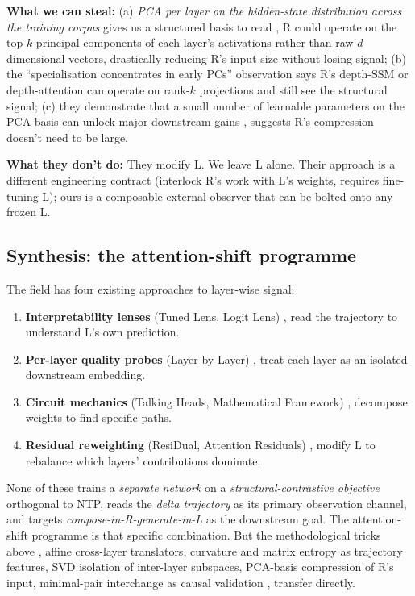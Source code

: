 \documentclass[10pt, twocolumn, a4paper]{article}
\begin{document}
\textbf{What we can steal:} (a) \emph{PCA per layer on the hidden-state distribution across the training corpus} gives us a structured basis to read ,  R could operate on the top-$k$ principal components of each layer's activations rather than raw $d$-dimensional vectors, drastically reducing R's input size without losing signal; (b) the ``specialisation concentrates in early PCs'' observation says R's depth-SSM or depth-attention can operate on rank-$k$ projections and still see the structural signal; (c) they demonstrate that a small number of learnable parameters on the PCA basis can unlock major downstream gains ,  suggests R's compression doesn't need to be large.

\textbf{What they don't do:} They modify L. We leave L alone. Their approach is a different engineering contract (interlock R's work with L's weights, requires fine-tuning L); ours is a composable external observer that can be bolted onto any frozen L.

\subsection*{Synthesis: the attention-shift programme}

The field has four existing approaches to layer-wise signal:

\begin{enumerate}[nosep,leftmargin=*]
\item \textbf{Interpretability lenses} (Tuned Lens, Logit Lens) ,  read the trajectory to understand L's own prediction.
\item \textbf{Per-layer quality probes} (Layer by Layer) ,  treat each layer as an isolated downstream embedding.
\item \textbf{Circuit mechanics} (Talking Heads, Mathematical Framework) ,  decompose weights to find specific paths.
\item \textbf{Residual reweighting} (ResiDual, Attention Residuals) ,  modify L to rebalance which layers' contributions dominate.
\end{enumerate}

None of these trains a \emph{separate network} on a \emph{structural-contrastive objective} orthogonal to NTP, reads the \emph{delta trajectory} as its primary observation channel, and targets \emph{compose-in-R-generate-in-L} as the downstream goal. The attention-shift programme is that specific combination. But the methodological tricks above ,  affine cross-layer translators, curvature and matrix entropy as trajectory features, SVD isolation of inter-layer subspaces, PCA-basis compression of R's input, minimal-pair interchange as causal validation ,  transfer directly.
\end{document}
